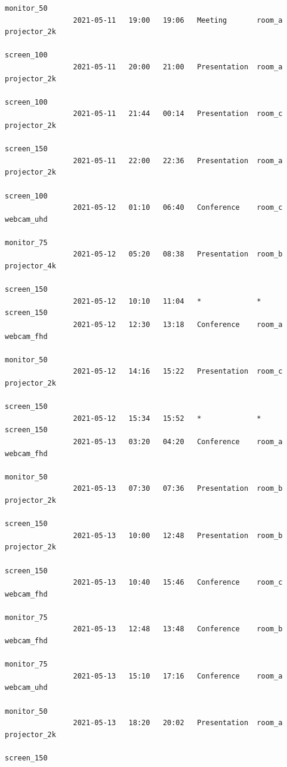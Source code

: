\documentclass{article}
\begin{document}
\begin{Verbatim}[gobble=8]
                                                                    monitor_50
                2021-05-11   19:00   19:06   Meeting       room_a   projector_2k
                                                                    screen_100
                2021-05-11   20:00   21:00   Presentation  room_a   projector_2k
                                                                    screen_100
                2021-05-11   21:44   00:14   Presentation  room_c   projector_2k
                                                                    screen_150
                2021-05-11   22:00   22:36   Presentation  room_a   projector_2k
                                                                    screen_100
                2021-05-12   01:10   06:40   Conference    room_c   webcam_uhd
                                                                    monitor_75
                2021-05-12   05:20   08:38   Presentation  room_b   projector_4k
                                                                    screen_150
                2021-05-12   10:10   11:04   *             *        screen_150
                2021-05-12   12:30   13:18   Conference    room_a   webcam_fhd
                                                                    monitor_50
                2021-05-12   14:16   15:22   Presentation  room_c   projector_2k
                                                                    screen_150
                2021-05-12   15:34   15:52   *             *        screen_150
                2021-05-13   03:20   04:20   Conference    room_a   webcam_fhd
                                                                    monitor_50
                2021-05-13   07:30   07:36   Presentation  room_b   projector_2k
                                                                    screen_150
                2021-05-13   10:00   12:48   Presentation  room_b   projector_2k
                                                                    screen_150
                2021-05-13   10:40   15:46   Conference    room_c   webcam_fhd
                                                                    monitor_75
                2021-05-13   12:48   13:48   Conference    room_b   webcam_fhd
                                                                    monitor_75
                2021-05-13   15:10   17:16   Conference    room_a   webcam_uhd
                                                                    monitor_50
                2021-05-13   18:20   20:02   Presentation  room_a   projector_2k
                                                                    screen_150

\end{Verbatim}
\end{document}
